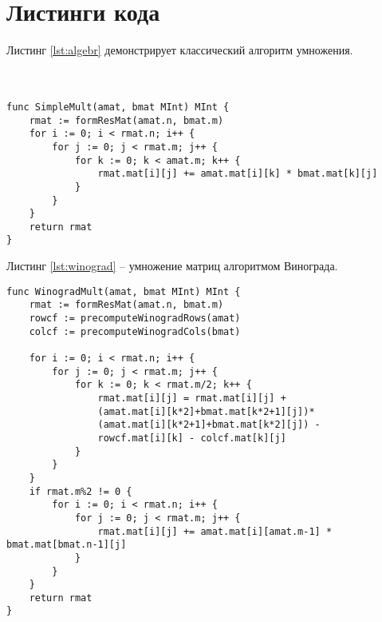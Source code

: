 \section{Листинги кода}
Листинг \ref{lst:algebr} демонстрирует классический алгоритм умножения. 
\\
\\
\\
\captionsetup{singlelinecheck = false, justification=raggedright}
\begin{lstlisting}[label=lst:algebr,caption=Классический алгоритм умножения]
func SimpleMult(amat, bmat MInt) MInt {
	rmat := formResMat(amat.n, bmat.m)
	for i := 0; i < rmat.n; i++ {
		for j := 0; j < rmat.m; j++ {
			for k := 0; k < amat.m; k++ {
				rmat.mat[i][j] += amat.mat[i][k] * bmat.mat[k][j]
			}
		}
	}
	return rmat
}
\end{lstlisting}
Листинг \ref{lst:winograd} -- умножение матриц алгоритмом Винограда.
\begin{lstlisting}[label=lst:winograd,caption=Алгоритм умнложения Виноградом]
func WinogradMult(amat, bmat MInt) MInt {
	rmat := formResMat(amat.n, bmat.m)
	rowcf := precomputeWinogradRows(amat)
	colcf := precomputeWinogradCols(bmat)
	
	for i := 0; i < rmat.n; i++ {
		for j := 0; j < rmat.m; j++ {
			for k := 0; k < rmat.m/2; k++ {
				rmat.mat[i][j] = rmat.mat[i][j] + 
				(amat.mat[i][k*2]+bmat.mat[k*2+1][j])*
				(amat.mat[i][k*2+1]+bmat.mat[k*2][j]) -
				rowcf.mat[i][k] - colcf.mat[k][j]
			}
		}
	}
	if rmat.m%2 != 0 {
		for i := 0; i < rmat.n; i++ {
			for j := 0; j < rmat.m; j++ {
				rmat.mat[i][j] += amat.mat[i][amat.m-1] * bmat.mat[bmat.n-1][j]
			}
		}
	}
	return rmat
}
\end{lstlisting}	


